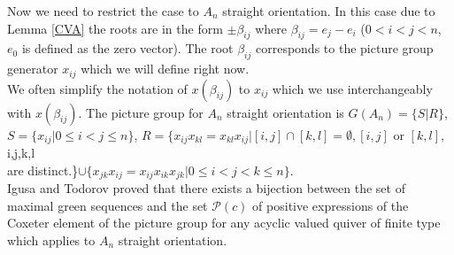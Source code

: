 \indent Now we need to restrict the case to $A_n$ straight orientation. In this case due to Lemma \ref{CVA} the roots are in the form $\pm\beta_{ij}$ where $\beta_{ij}=e_j-e_i$ ($0<i<j<n$, $e_0$ is defined as the zero vector). The root $\beta_{ij}$ corresponds to the picture group generator $x_{ij}$ which we will define right now.\\
\indent We often simplify the notation of $x(\beta_{ij})$ to $x_{ij}$ which we use interchangeably with $x(\beta_{ij})$. The picture group for $A_n$ straight orientation is $G(A_n)=\{S|R\}$, $S=\{x_{ij}|0\leq i<j\leq n\}$, $R=\{x_{ij}x_{kl}=x_{kl}x_{ij}|[i,j]\cap[k,l]=\emptyset, [i,j]\text{ or }[k,l], $ i,j,k,l \\are distinct.\}$\cup\{x_{jk}x_{ij}=x_{ij}x_{ik}x_{jk}|0\leq i<j<k\leq n\}$.\\
\indent Igusa and Todorov proved \cite{IT17} that there exists a bijection between the set of maximal green sequences and the set $\mathcal{P}(c)$ of positive expressions of the Coxeter element of the picture group for any acyclic valued quiver of finite type which applies to $A_n$ straight orientation.\\
